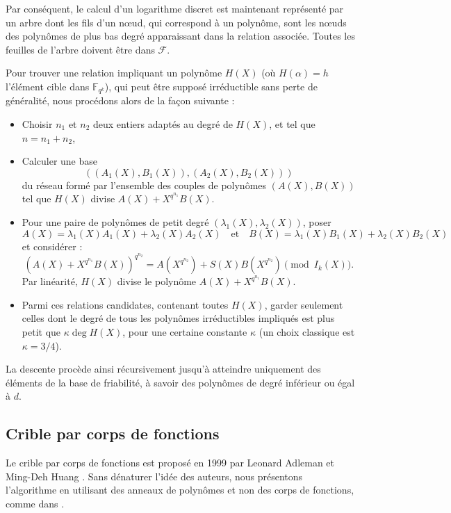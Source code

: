 \documentclass[a4paper, titlepage, 11pt]{article}
\theoremstyle{definition}
\theoremstyle{remark}
\def\gf #1{\mathbb{F}_{#1}}
\begin{document}
Par conséquent, le calcul d'un logarithme discret est maintenant représenté par un arbre dont les fils d'un n\oe ud, qui correspond à un polynôme, sont les n\oe uds des polynômes de plus bas degré apparaissant dans la relation associée. Toutes les feuilles de l'arbre doivent être dans $\mathcal{F}$.

Pour trouver une relation impliquant un polynôme $H(X)$ (où $H(\alpha) = h$ l'élément cible dans $\gf{q^k}$), qui peut être supposé irréductible sans perte de généralité, nous procédons alors de la façon suivante : \begin{itemize}
\item Choisir $n_1$ et $n_2$ deux entiers adaptés au degré de $H(X)$, et tel que $n = n_1 + n_2$,
\item Calculer une base $$((A_1(X), B_1(X)), (A_2(X), B_2(X)))$$ du réseau formé par l'ensemble des couples de polynômes $(A(X),B(X))$ tel que $H(X)$ divise $A(X) + X^{q^{n_1}}B(X)$.
\item Pour une paire de polynômes de petit degré $(\lambda_1(X), \lambda_2(X))$, poser
$$A(X) = \lambda_1(X)A_1(X) + \lambda_2(X)A_2(X) \quad\text{et}\quad B(X) = \lambda_1(X)B_1(X) + \lambda_2(X)B_2(X)$$ et considérer :
$${\left( A(X) + X^{q^{n_1}}B(X)\right)}^{q^{n_2}} = A(X^{q^{n_2}}) + S(X)B(X^{q^{n_2}}) \pmod{I_k(X)}.$$
Par linéarité, $H(X)$ divise le polynôme $A(X) + X^{q^{n_1}}B(X)$.
\item Parmi ces relations candidates, contenant toutes $H(X)$, garder seulement celles dont le degré de tous les polynômes irréductibles impliqués est plus petit que $\kappa \deg H(X)$, pour une certaine constante $\kappa$ (un choix classique est $\kappa = 3/4$).
\end{itemize}
La descente procède ainsi récursivement jusqu'à atteindre uniquement des éléments de la base de friabilité, à savoir des polynômes de degré inférieur ou égal à $d$.

\subsection{Crible par corps de fonctions}

Le crible par corps de fonctions est proposé en 1999 par Leonard Adleman et Ming-Deh Huang \cite{adleman1999}. Sans dénaturer l'idée des auteurs, nous présentons l'algorithme en utilisant des anneaux de polynômes et non des corps de fonctions, comme dans \cite{joux2013, joux2006, pierrot2016}.
\end{document}
